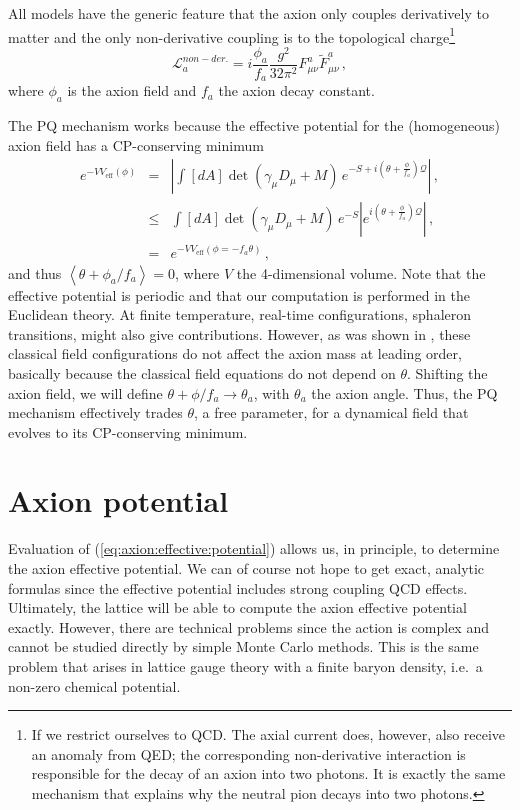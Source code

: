 \documentclass[preprint,nofootinbib]{revtex4}
\newcommand{\mean}[1]{\left\langle #1 \right\rangle}
\begin{document}
All models have the generic feature that the axion only couples derivatively to matter and the only non-derivative coupling is to the topological charge\footnote{If we restrict ourselves to QCD. The axial current does, however, also receive an anomaly from QED; the corresponding non-derivative interaction is responsible for the decay of an axion into two photons. It is exactly the same mechanism that explains why the neutral pion decays into two photons.}
\begin{equation}
\mathcal{L}^{non-der.}_a = i\frac{\phi_a}{f_a} \frac{g^2}{32\pi^2} F^{a}_{\mu\nu} \tilde{F}^{a}_{\mu\nu} \,,
\end{equation}
where $\phi_a$ is the axion field and $f_a$ the axion decay constant.

The PQ mechanism works because the effective potential for the (homogeneous) axion field has a CP-conserving minimum \cite{kim:report}
\begin{eqnarray}
e^{-V  V_\mathrm{eff}(\phi)} &=&\left|\int [dA] \det(\gamma_\mu D_\mu + M)\,e^{-S+i(\theta+\frac{\phi}{f_a})\mathcal{Q}} \right|\,, \label{eq:axion:effective:potential}\\
&\le& \int [dA] \det(\gamma_\mu D_\mu + M)\, e^{-S}\left|e^{i(\theta+\frac{\phi}{f_a})\mathcal{Q}} \right|\,, \\
&=& e^{-V V_\mathrm{eff}(\phi=-f_a \theta)}\, ,
\end{eqnarray}
and thus $\mean{\theta+\phi_a/f_a}=0$, where $V$ the 4-dimensional volume. Note that the effective potential is periodic and that our computation is performed in the Euclidean theory. At finite temperature, real-time configurations, sphaleron transitions, might also give contributions. However, as was shown in \cite{mclerran:mottola:axion:sphaleron}, these classical field configurations do not affect the axion mass at leading order, basically because the classical field equations do not depend on $\theta$. Shifting the axion field, we will define $\theta + \phi/f_a \to \theta_a$, with $\theta_a$ the axion angle. Thus, the PQ mechanism effectively trades $\theta$, a free parameter, for a dynamical field that evolves to its CP-conserving minimum.

\section{Axion potential}
\label{sec:axion:potential}

Evaluation of (\ref{eq:axion:effective:potential}) allows us, in principle, to determine the axion effective potential. We can of course not hope to get exact, analytic formulas since the effective potential includes strong coupling QCD effects. Ultimately, the lattice will be able to compute the axion effective potential exactly. However, there are technical problems since the action is complex and cannot be studied directly by simple Monte Carlo methods. This is the same problem that arises in lattice gauge theory with a finite baryon density, i.e.\ a non-zero chemical potential.
\end{document}
